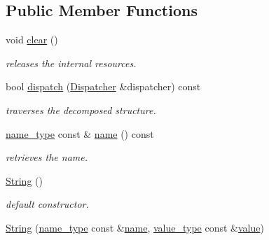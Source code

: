 \subsection*{Public Member Functions}
\begin{DoxyCompactItemize}
\item 
\hypertarget{classhryky_1_1reduction_1_1_string_ae524ae5260609c2df1809c685b3d53b9}{void \hyperlink{classhryky_1_1reduction_1_1_string_ae524ae5260609c2df1809c685b3d53b9}{clear} ()}\label{classhryky_1_1reduction_1_1_string_ae524ae5260609c2df1809c685b3d53b9}

\begin{DoxyCompactList}\small\item\em releases the internal resources. \end{DoxyCompactList}\item 
bool \hyperlink{classhryky_1_1reduction_1_1_base_a71b31d4d0ed915254e2cb1ef217f28c4}{dispatch} (\hyperlink{classhryky_1_1reduction_1_1_dispatcher}{Dispatcher} \&dispatcher) const 
\begin{DoxyCompactList}\small\item\em traverses the decomposed structure. \end{DoxyCompactList}\item 
\hypertarget{classhryky_1_1reduction_1_1_base_a842569265d741905eb8a353d3935f1d1}{\hyperlink{namespacehryky_1_1reduction_ac686c30a4c8d196bbd0f05629a6b921f}{name\-\_\-type} const \& \hyperlink{classhryky_1_1reduction_1_1_base_a842569265d741905eb8a353d3935f1d1}{name} () const }\label{classhryky_1_1reduction_1_1_base_a842569265d741905eb8a353d3935f1d1}

\begin{DoxyCompactList}\small\item\em retrieves the name. \end{DoxyCompactList}\item 
\hypertarget{classhryky_1_1reduction_1_1_string_ae696533e5e7ab4ecdc2a15b04acb3122}{\hyperlink{classhryky_1_1reduction_1_1_string_ae696533e5e7ab4ecdc2a15b04acb3122}{String} ()}\label{classhryky_1_1reduction_1_1_string_ae696533e5e7ab4ecdc2a15b04acb3122}

\begin{DoxyCompactList}\small\item\em default constructor. \end{DoxyCompactList}\item 
\hypertarget{classhryky_1_1reduction_1_1_string_aa29e4ffe0e3fa506d53add97e4dc4ec6}{\hyperlink{classhryky_1_1reduction_1_1_string_aa29e4ffe0e3fa506d53add97e4dc4ec6}{String} (\hyperlink{namespacehryky_1_1reduction_ac686c30a4c8d196bbd0f05629a6b921f}{name\-\_\-type} const \&\hyperlink{classhryky_1_1reduction_1_1_base_a842569265d741905eb8a353d3935f1d1}{name}, \hyperlink{classhryky_1_1_string}{value\-\_\-type} const \&\hyperlink{classhryky_1_1reduction_1_1_string_a34e0856d63ec32786de19999a4ac1ce1}{value})}\label{classhryky_1_1reduction_1_1_string_aa29e4ffe0e3fa506d53add97e4dc4ec6}


\end{DoxyCompactItemize}
